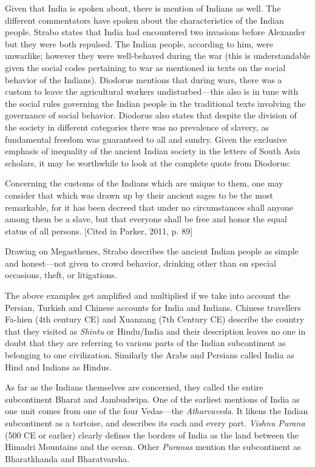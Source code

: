 Given that India is spoken about, there is mention of Indians as well. The different commentators have spoken about the characteristics of the Indian people. Strabo states that India had encountered two invasions before Alexander but they were both repulsed. The Indian people, according to him, were unwarlike; however they were well-behaved during the war (this is understandable given the social codes pertaining to war as mentioned in texts on the social behavior of the Indians). Diodorus mentions that during wars, there was a custom to leave the agricultural workers undisturbed—this also is in tune with the social rules governing the Indian people in the traditional texts involving the governance of social behavior. Diodorus also states that despite the division of the society in different categories there was no prevalence of slavery, as fundamental freedom was guaranteed to all and sundry. Given the exclusive emphasis of inequality of the ancient Indian society in the letters of South Asia scholars, it may be worthwhile to look at the complete quote from Diodorus: 

Concerning the customs of the Indians which are unique to them, one may consider that which was drawn up by their ancient sages to be the most remarkable, for it has been decreed that under no circumstances shall anyone among them be a slave, but that everyone shall be free and honor the equal status of all persons. [Cited in Parker, 2011, p. 89]

Drawing on Megasthenes, Strabo describes the ancient Indian people as simple and honest—not given to crowd behavior, drinking other than on special occasions, theft, or litigations.

The above examples get amplified and multiplied if we take into account the Persian, Turkish and Chinese accounts for India and Indians. Chinese travellers Fa-hien (4th century CE) and Xuanzang (7th Century CE) describe the country that they visited as \textit{Shintu} or Hindu/India and their description leaves no one in doubt that they are referring to various parts of the Indian subcontinent as belonging to one civilization. Similarly the Arabs and Persians called India as Hind and Indians as Hindus. 

As far as the Indians themselves are concerned, they called the entire subcontinent Bharat and Jambudwipa. One of the earliest mentions of India as one unit comes from one of the four Vedas—the \textit{Atharvaveda}. It likens the Indian subcontinent as a tortoise, and describes its each and every part. \textit{Vishnu Purana} (500 CE or earlier) clearly defines the borders of India as the land between the Himadri Mountains and the ocean. Other \textit{Puranas} mention the subcontinent as Bharatkhanda and Bharatvarsha. 


